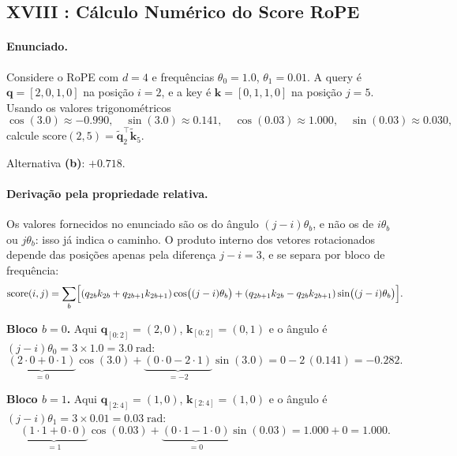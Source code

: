 \documentclass{dlproblemset}
\begin{document}
\subsection*{XVIII {\mdseries{}}: Cálculo Numérico do Score RoPE}

\paragraph{Enunciado.}
Considere o RoPE com $d = 4$ e frequências $\theta_0 = 1.0$, $\theta_1 = 0.01$.
A query é $\mathbf{q} = [2, 0, 1, 0]$ na posição $i = 2$, e a key é
$\mathbf{k} = [0, 1, 1, 0]$ na posição $j = 5$. Usando os valores trigonométricos
\[
  \cos(3.0) \approx -0.990,\quad \sin(3.0) \approx 0.141,\quad
  \cos(0.03) \approx 1.000,\quad \sin(0.03) \approx 0.030,
\]
calcule $\mathrm{score}(2,5) = \tilde{\mathbf{q}}_2^\top \tilde{\mathbf{k}}_5$.

\begin{respostabox}
Alternativa \textbf{(b)}: $+0.718$.
\end{respostabox}

\paragraph{Derivação pela propriedade relativa.}
Os valores fornecidos no enunciado são os do ângulo $(j-i)\theta_b$, e não os de
$i\theta_b$ ou $j\theta_b$: isso já indica o caminho. O produto interno dos vetores
rotacionados depende das posições apenas pela diferença $j - i = 3$, e se separa por
bloco de frequência:
\[
  \mathrm{score}(i,j) = \sum_{b}\Bigl[(q_{2b}k_{2b} + q_{2b+1}k_{2b+1})\cos\bigl((j-i)\theta_b\bigr)
  + (q_{2b+1}k_{2b} - q_{2b}k_{2b+1})\sin\bigl((j-i)\theta_b\bigr)\Bigr].
\]

\bigskip
\textbf{Bloco $b = 0$.} Aqui $\mathbf{q}_{[0:2]} = (2, 0)$, $\mathbf{k}_{[0:2]} = (0, 1)$
e o ângulo é $(j-i)\theta_0 = 3 \times 1.0 = 3.0\;\mathrm{rad}$:
\[
  \underbrace{(2 \cdot 0 + 0 \cdot 1)}_{= 0}\cos(3.0)
  + \underbrace{(0 \cdot 0 - 2 \cdot 1)}_{= -2}\sin(3.0)
  = 0 - 2\,(0.141) = -0.282.
\]

\bigskip
\textbf{Bloco $b = 1$.} Aqui $\mathbf{q}_{[2:4]} = (1, 0)$, $\mathbf{k}_{[2:4]} = (1, 0)$
e o ângulo é $(j-i)\theta_1 = 3 \times 0.01 = 0.03\;\mathrm{rad}$:
\[
  \underbrace{(1 \cdot 1 + 0 \cdot 0)}_{= 1}\cos(0.03)
  + \underbrace{(0 \cdot 1 - 1 \cdot 0)}_{= 0}\sin(0.03)
  = 1.000 + 0 = 1.000.
\]
\end{document}
